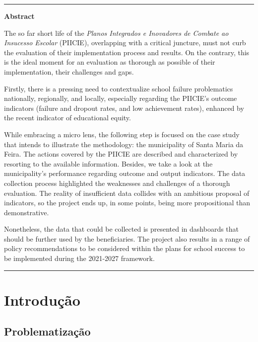 \documentclass[
]{book}
\begin{document}
\begin{center}\rule{0.5\linewidth}{0.5pt}\end{center}

\textbf{Abstract}

The so far short life of the \emph{Planos Integrados e Inovadores de Combate ao Insucesso Escolar} (PIICIE), overlapping with a critical juncture, must not curb the evaluation of their implementation process and results. On the contrary, this is the ideal moment for an evaluation as thorough as possible of their implementation, their challenges and gaps.

Firstly, there is a pressing need to contextualize school failure problematics nationally, regionally, and locally, especially regarding the PIICIE's outcome indicators (failure and dropout rates, and low achievement rates), enhanced by the recent indicator of educational equity.

While embracing a micro lens, the following step is focused on the case study that intends to illustrate the methodology: the municipality of Santa Maria da Feira. The actions covered by the PIICIE are described and characterized by resorting to the available information. Besides, we take a look at the municipality's performance regarding outcome and output indicators. The data collection process highlighted the weaknesses and challenges of a thorough evaluation. The reality of insufficient data collides with an ambitious proposal of indicators, so the project ends up, in some points, being more propositional than demonstrative.

Nonetheless, the data that could be collected is presented in dashboards that should be further used by the beneficiaries. The project also results in a range of policy recommendations to be considered within the plans for school success to be implemented during the 2021-2027 framework.

\begin{center}\rule{0.5\linewidth}{0.5pt}\end{center}

\hypertarget{introduuxe7uxe3o}{%
\chapter{\texorpdfstring{\textbf{Introdução}}{Introdução}}\label{introduuxe7uxe3o}}

\hypertarget{problematizauxe7uxe3o}{%
\section{\texorpdfstring{\textbf{Problematização}}{Problematização}}\label{problematizauxe7uxe3o}}
\end{document}
